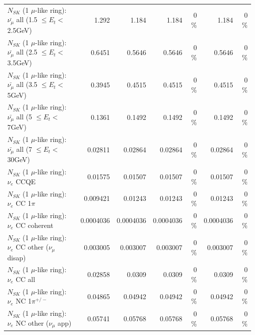 \begin{table}
\begin{tabular}{| l | r | r | r  r | r  r |}
 $N_{SK}$ (1 $\mu$-like ring): $\bar{\nu_{\mu}}$ all (1.5 $\leq E_{t} <$ 2.5GeV) &           1.292 &           1.184 &           1.184 &        0 \%  &           1.184 &        0 \%  \\ 
 $N_{SK}$ (1 $\mu$-like ring): $\bar{\nu_{\mu}}$ all (2.5 $\leq E_{t} <$ 3.5GeV) &          0.6451 &          0.5646 &          0.5646 &        0 \%  &          0.5646 &        0 \%  \\ 
   $N_{SK}$ (1 $\mu$-like ring): $\bar{\nu_{\mu}}$ all (3.5 $\leq E_{t} <$ 5GeV) &          0.3945 &          0.4515 &          0.4515 &        0 \%  &          0.4515 &        0 \%  \\ 
     $N_{SK}$ (1 $\mu$-like ring): $\bar{\nu_{\mu}}$ all (5 $\leq E_{t} <$ 7GeV) &          0.1361 &          0.1492 &          0.1492 &        0 \%  &          0.1492 &        0 \%  \\ 
    $N_{SK}$ (1 $\mu$-like ring): $\bar{\nu_{\mu}}$ all (7 $\leq E_{t} <$ 30GeV) &         0.02811 &         0.02864 &         0.02864 &        0 \%  &         0.02864 &        0 \%  \\ 
\hline
\hline
\hline
                                      $N_{SK}$ (1 $\mu$-like ring): $\nu_e$ CCQE &         0.01575 &         0.01507 &         0.01507 &        0 \%  &         0.01507 &        0 \%  \\ 
                                 $N_{SK}$ (1 $\mu$-like ring): $\nu_e$ CC 1$\pi$ &        0.009421 &         0.01243 &         0.01243 &        0 \%  &         0.01243 &        0 \%  \\ 
                               $N_{SK}$ (1 $\mu$-like ring): $\nu_e$ CC coherent &       0.0004036 &       0.0004036 &       0.0004036 &        0 \%  &       0.0004036 &        0 \%  \\ 
                $N_{SK}$ (1 $\mu$-like ring): $\nu_e$ CC other ($\nu_\mu$ disap) &        0.003005 &        0.003007 &        0.003007 &        0 \%  &        0.003007 &        0 \%  \\ 
                                  $N_{SK}$ (1 $\mu$-like ring): $\nu_{e}$ CC all &         0.02858 &          0.0309 &          0.0309 &        0 \%  &          0.0309 &        0 \%  \\ 
\hline
                           $N_{SK}$ (1 $\mu$-like ring): $\nu_e$ NC 1$\pi^{+/-}$ &         0.04865 &         0.04942 &         0.04942 &        0 \%  &         0.04942 &        0 \%  \\ 
                  $N_{SK}$ (1 $\mu$-like ring): $\nu_e$ NC other ($\nu_\mu$ app) &         0.05741 &         0.05768 &         0.05768 &        0 \%  &         0.05768 &        0 \%  \\ 

\end{tabular}
\end{table}
